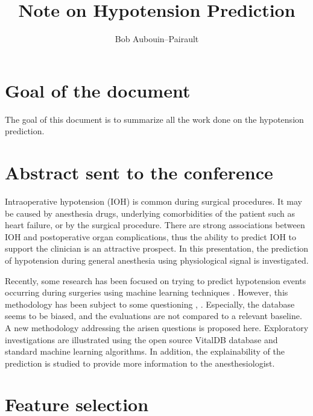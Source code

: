 \documentclass[a4paper,12pt]{article}
\begin{document}
\title{Note on Hypotension Prediction}

\author{Bob Aubouin--Pairault}
\maketitle


\section{Goal of the document}

The goal of this document is to summarize all the work done on the hypotension prediction.


\section{Abstract sent to the conference}

Intraoperative hypotension (IOH) is common during surgical procedures. It may be caused by anesthesia drugs, underlying  comorbidities of the patient such as heart failure, or by the surgical procedure. There are strong associations between IOH and postoperative organ complications, thus the ability to predict IOH to support the clinician is an attractive prospect. In this presentation, the prediction of hypotension during general anesthesia using physiological signal is investigated. \medskip

Recently, some research has been focused on trying to predict hypotension events occurring during surgeries using machine learning techniques \cite{hatibMachinelearningAlgorithmPredict2018}. However, this methodology has been subject to some questioning \cite{enevoldsenPerformanceHypotensionPrediction2022}, \cite{smithConHypotensionPrediction2023}. Especially, the database seems to be biased, and the evaluations are not compared to a relevant baseline. A new methodology addressing the arisen questions is proposed here. Exploratory investigations are illustrated using the open source VitalDB database \cite{leeVitalDBHighfidelityMultiparameter2022} and standard machine learning algorithms. In addition, the explainability of the prediction is studied to provide more information to the anesthesiologist.


\section{Feature selection}
\end{document}
